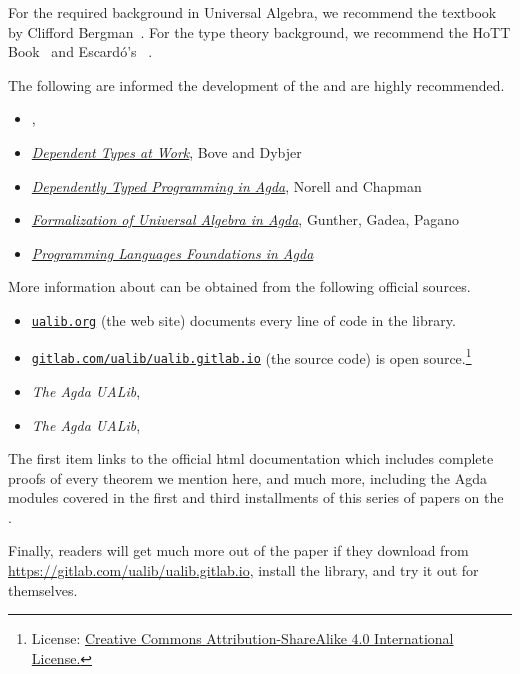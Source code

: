 For the required background in Universal Algebra, we recommend the textbook by Clifford Bergman~\cite{Bergman:2012}.  For the type theory background, we recommend the HoTT Book~\cite{HoTT} and Escard\'o's \ufcourse~\cite{MHE}.

The following are informed the development of the \ualib and are highly recommended.
\begin{itemize}
\item \textit{\ufcourse}, \escardo~\cite{MHE}
\item \href{http://www.cse.chalmers.se/~peterd/papers/DependentTypesAtWork.pdf}{\it Dependent Types at Work}, Bove and Dybjer~\cite{Bove:2009}
\item \href{http://www.cse.chalmers.se/~ulfn/papers/afp08/tutorial.pdf}{\it Dependently Typed Programming in Agda}, Norell and Chapman~\cite{Norell:2008}
\item \href{http://www.sciencedirect.com/science/article/pii/S1571066118300768}{\it Formalization of Universal Algebra in Agda}, Gunther, Gadea, Pagano~\cite{Gunther:2018}
\item \href{https://plfa.github.io/}{\it Programming Languages Foundations in Agda}~\cite{Wadler:2020}
\end{itemize}

More information about \agdaualib can be obtained from the following official sources.
\begin{itemize}
  \item \href{https://ualib.gitlab.io}{\texttt{ualib.org}} (the web site) documents every line of code in the library.
  \item \href{https://gitlab.com/ualib/ualib.gitlab.io}{\texttt{gitlab.com/ualib/ualib.gitlab.io}} (the source code) \agdaualib is open source.\footnote{License: \href{https://creativecommons.org/licenses/by-sa/4.0/}{Creative Commons Attribution-ShareAlike 4.0 International License.}}
  \item \emph{The Agda UALib}, \otherparta
  \item \emph{The Agda UALib}, \otherpartb
\end{itemize}
The first item links to the official \ualib html documentation which includes complete proofs of every theorem we mention here, and much more, including the Agda modules covered in the first and third installments of this series of papers on the \ualib.

Finally, readers will get much more out of the paper if they download \agdaualib from \url{https://gitlab.com/ualib/ualib.gitlab.io}, install the library, and try it out for themselves.